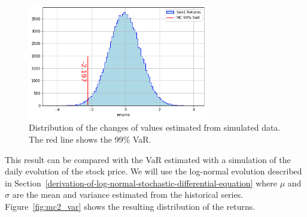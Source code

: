 \begin{figure}[htb]
	\centering
	\includegraphics[width=0.7\textwidth]{figures/sim1_var}
	\caption{Distribution of the changes of values estimated from simulated data. The red line shows the 99\% VaR.}
	\label{fig:mc1_var}
\end{figure}

This result can be compared with the VaR estimated with a simulation of the daily evolution of the stock price. We will use the log-normal evolution described in Section~\ref{derivation-of-log-normal-stochastic-differential-equation} where $\mu$ and $\sigma$ are the mean and variance estimated from the historical series. Figure~\ref{fig:mc2_var} shows the resulting distribution of the returns.

